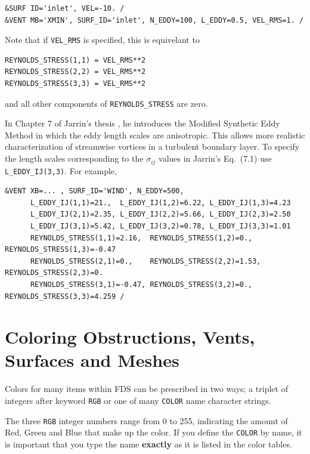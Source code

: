 \documentclass[11pt]{book}
\newcommand{\ct}{\tt\small}
\begin{document}
\footnotesize
\begin{verbatim}
&SURF ID='inlet', VEL=-10. /
&VENT MB='XMIN', SURF_ID='inlet', N_EDDY=100, L_EDDY=0.5, VEL_RMS=1. /
\end{verbatim} \normalsize

\noindent Note that if {\ct VEL\_RMS} is specified, this is equivelant to

\footnotesize
\begin{verbatim}
REYNOLDS_STRESS(1,1) = VEL_RMS**2
REYNOLDS_STRESS(2,2) = VEL_RMS**2
REYNOLDS_STRESS(3,3) = VEL_RMS**2
\end{verbatim} \normalsize

\noindent and all other components of {\ct REYNOLDS\_STRESS} are zero.

In Chapter 7 of Jarrin's thesis \cite{Jarrin:2008}, he introduces the Modified Synthetic Eddy Method in which the eddy length scales are anisotropic.
This allows more realistic characterization of streamwise vortices in a turbulent boundary layer.
To specify the length scales corresponding to the $\sigma_{ij}$ values in Jarrin's Eq.~(7.1) use {\ct L\_EDDY\_IJ(3,3)}.  For example,

\footnotesize
\begin{verbatim}
&VENT XB=... , SURF_ID='WIND', N_EDDY=500,
      L_EDDY_IJ(1,1)=21.,  L_EDDY_IJ(1,2)=6.22, L_EDDY_IJ(1,3)=4.23
      L_EDDY_IJ(2,1)=2.35, L_EDDY_IJ(2,2)=5.66, L_EDDY_IJ(2,3)=2.50
      L_EDDY_IJ(3,1)=5.42, L_EDDY_IJ(3,2)=0.78, L_EDDY_IJ(3,3)=1.01
      REYNOLDS_STRESS(1,1)=2.16,  REYNOLDS_STRESS(1,2)=0.,   REYNOLDS_STRESS(1,3)=-0.47
      REYNOLDS_STRESS(2,1)=0.,    REYNOLDS_STRESS(2,2)=1.53, REYNOLDS_STRESS(2,3)=0.
      REYNOLDS_STRESS(3,1)=-0.47, REYNOLDS_STRESS(3,2)=0.,   REYNOLDS_STRESS(3,3)=4.259 /
\end{verbatim} \normalsize

\clearpage

\section{Coloring Obstructions, Vents, Surfaces and Meshes}
\label{info:colors}

Colors for many items within FDS can be prescribed in two ways; a triplet of
integers after keyword {\ct RGB} or one of many {\ct COLOR} name character strings.

The three {\ct RGB} integer numbers range from 0 to 255, indicating the amount of Red, Green and Blue
that make up the color. If you define the {\ct COLOR} by name, it is important that you type the name {\bf exactly} as it
is listed in the color tables.
\end{document}
